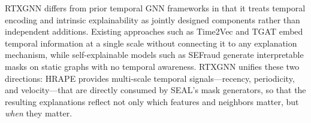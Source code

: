 RTXGNN differs from prior temporal GNN frameworks in that it treats temporal encoding and intrinsic explainability as jointly designed components rather than independent additions. Existing approaches such as Time2Vec \citep{DBLP:conf/eusipco/BuiCKB25} and TGAT \citep{DBLP:conf/pakdd/XieLTLYLCC23} embed temporal information at a single scale without connecting it to any explanation mechanism, while self-explainable models such as SEFraud \citep{li2024sefraud} generate interpretable masks on static graphs with no temporal awareness. RTXGNN unifies these two directions: HRAPE provides multi-scale temporal signals—recency, periodicity, and velocity—that are directly consumed by SEAL's mask generators, so that the resulting explanations reflect not only which features and neighbors matter, but \textit{when} they matter.
